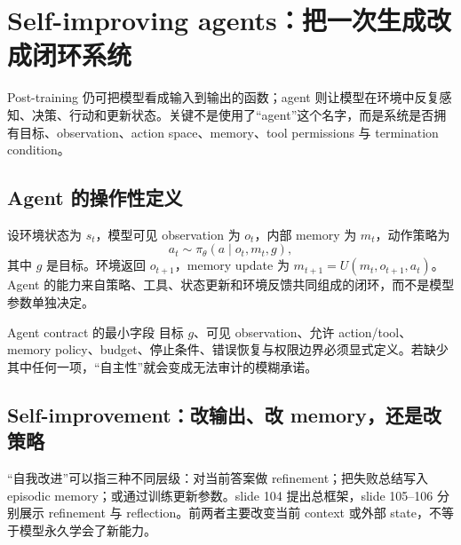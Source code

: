 \section{Self-improving agents：把一次生成改成闭环系统}

Post-training 仍可把模型看成输入到输出的函数；agent 则让模型在环境中反复感知、决策、行动和更新状态。关键不是使用了“agent”这个名字，而是系统是否拥有目标、observation、action space、memory、tool permissions 与 termination condition。

\subsection{Agent 的操作性定义}

设环境状态为 $s_t$，模型可见 observation 为 $o_t$，内部 memory 为 $m_t$，动作策略为
\[
a_t\sim\pi_{\theta}(a\mid o_t,m_t,g),
\]
其中 $g$ 是目标。环境返回 $o_{t+1}$，memory update 为 $m_{t+1}=U(m_t,o_{t+1},a_t)$。Agent 的能力来自策略、工具、状态更新和环境反馈共同组成的闭环，而不是模型参数单独决定。




\begin{importantbox}{Agent contract 的最小字段}
目标 $g$、可见 observation、允许 action/tool、memory policy、budget、停止条件、错误恢复与权限边界必须显式定义。若缺少其中任何一项，“自主性”就会变成无法审计的模糊承诺。
\end{importantbox}

\subsection{Self-improvement：改输出、改 memory，还是改策略}

“自我改进”可以指三种不同层级：对当前答案做 refinement；把失败总结写入 episodic memory；或通过训练更新参数。slide 104 提出总框架，slide 105--106 分别展示 refinement 与 reflection。前两者主要改变当前 context 或外部 state，不等于模型永久学会了新能力。


